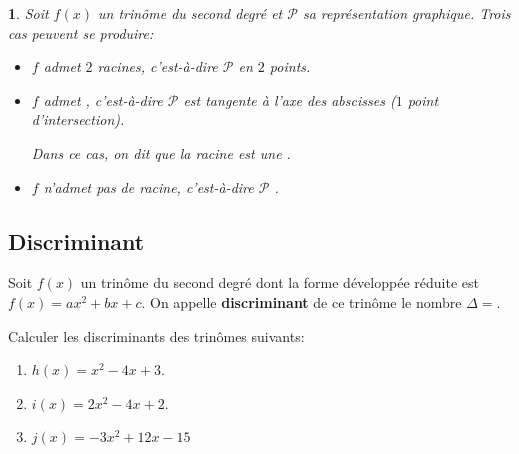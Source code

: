 \documentclass{beamer}
\newtheorem{proposition}[theorem]{\translate{Proposition}}
\begin{document}
\begin{frame}
  \begin{proposition}
   Soit $f(x)$ un trinôme du second degré et $\mathcal{P}$ sa représentation graphique.
    Trois cas peuvent se produire:
   
   \begin{itemize}
    \item $f$ admet $2$ racines, c'est-à-dire $\mathcal{P}$ 
    en $2$ points.
    \item $f$ admet , c'est-à-dire $\mathcal{P}$
    est tangente à l'axe
    des abscisses ($1$ point d'intersection).
    
    Dans ce cas, on dit que la racine est une .
    
    \item $f$ n'admet pas de racine, c'est-à-dire $\mathcal{P}$ 
    .
   \end{itemize}
   
  \end{proposition}
\end{frame}

\subsection{Discriminant}

\begin{frame}
 \begin{definition}[Discriminant]
    Soit $f(x)$ un trinôme du second degré dont la forme développée réduite
    est $f(x)=ax^2+bx+c$. On appelle \textbf{discriminant} de ce trinôme
    le nombre $\Delta=$.
    
  \end{definition}
  
  \begin{example}
    
    Calculer les discriminants des trinômes suivants:
    \begin{enumerate}
     \item $h(x)=x^2-4x+3$.
     \item $i(x)=2x^2-4x+2$.
     \item $j(x)=-3x^2+12x-15$
    \end{enumerate}
   \end{example}
\end{frame}
\end{document}
